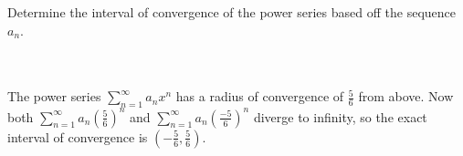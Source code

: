 Determine the interval of convergence of the power series based off the sequence $a_n$.\\\\

\begin{solution}\renewcommand{\qedsymbol}{}\ \\
    The power series $\sum_{n=1}^{\infty} a_nx^n$ has a radius of convergence of $\frac56$ from above.
    Now both $\sum_{n=1}^{\infty}a_n(\frac56)^n$ and $\sum_{n=1}^{\infty}a_n(\frac{-5}{6})^n$ diverge to
    infinity, so the exact interval of convergence is $(-\frac56,\frac56)$.

\end{solution}